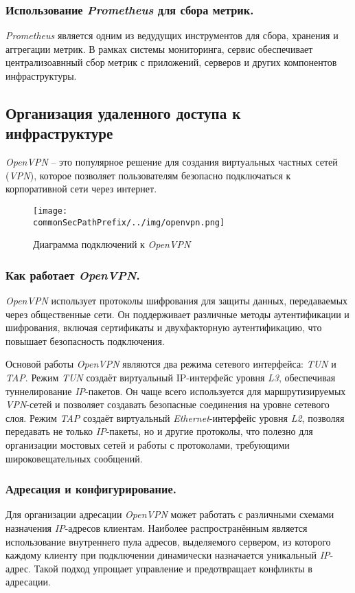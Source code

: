 \subsubsection{Использование \textit{Prometheus} для сбора метрик.}
\textit{Prometheus} является одним из ведудущих инструментов для сбора, хранения и аггрегации метрик. В рамках системы мониторинга, сервис обеспечивает централизоавнный сбор метрик с приложений, серверов и других компонентов инфраструктуры.

\subsection{Организация удаленного доступа к инфраструктуре}
\label{sec:vpn}
\textit{OpenVPN} -- это популярное решение для создания виртуальных частных сетей (\textit{VPN})\cite{openvpn}, которое позволяет пользователям безопасно подключаться к корпоративной сети через интернет.

\begin{figure}[ht]
    \centering
    \texttt{[image: \\commonSecPathPrefix/../img/openvpn.png]}
    \caption{Диаграмма подключений к \textit{OpenVPN}}
    \label{fig:user_guide:openvpn_diagram}
\end{figure}

\subsubsection{Как работает \textit{OpenVPN}.}
\textit{OpenVPN} использует протоколы шифрования для защиты данных, передаваемых через общественные сети. Он поддерживает различные методы аутентификации и шифрования, включая сертификаты и двухфакторную аутентификацию, что повышает безопасность подключения.

Основой работы \textit{OpenVPN} являются два режима сетевого интерфейса: \textit{TUN} и \textit{TAP}. Режим \textit{TUN} создаёт виртуальный IP-интерфейс уровня \textit{L3}, обеспечивая туннелирование \textit{IP}-пакетов. Он чаще всего используется для маршрутизируемых \textit{VPN}-сетей и позволяет создавать безопасные соединения на уровне сетевого слоя. Режим \textit{TAP} создаёт виртуальный \textit{Ethernet}-интерфейс уровня \textit{L2}, позволяя передавать не только \textit{IP}-пакеты, но и другие протоколы, что полезно для организации мостовых сетей и работы с протоколами, требующими широковещательных сообщений.

\subsubsection{Адресация и конфигурирование.}
Для организации адресации \textit{OpenVPN} может работать с различными схемами назначения \textit{IP}-адресов клиентам. Наиболее распространённым является использование внутреннего пула адресов, выделяемого сервером, из которого каждому клиенту при подключении динамически назначается уникальный \textit{IP}-адрес. Такой подход упрощает управление и предотвращает конфликты в адресации.

